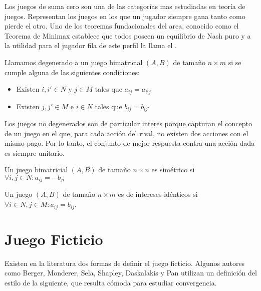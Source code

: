 Los juegos de suma cero son una de las categorías mas estudiadas en teoría de juegos. Representan los juegos en los que un jugador siempre gana tanto como pierde el otro. Uno de los teoremas fundacionales del area, conocido como el Teorema de Minimax \cite{nash:minmax} establece que todos poseen un equilibrio de Nash puro y a la utilidad para el jugador fila de este perfil la llama el .

\begin{definition}
    Llamamos degenerado a un juego bimatricial $(A, B)$ de tamaño $n \times m$ si se cumple alguna de las siguientes condiciones:
    \begin{itemize}
        \item Existen $i, i' \in N$ y $j \in M$ tales que $a_{ij} = a_{i'j}$
        \item Existen $j, j' \in M$ e $i \in N$ tales que $b_{ij} = b_{ij'}$
    \end{itemize}
\end{definition}
Los juegos no degenerados son de particular interes porque capturan el concepto de un juego en el que, para cada acción del rival, no existen dos acciones con el mismo pago. Por lo tanto, el conjunto de mejor respuesta contra una acción dada es siempre unitario.

\begin{definition}
    Un juego bimatricial $(A, B)$ de tamaño $n \times n$ es simétrico si $\forall i, j \in N : a_{ij} = -b_{ji}$
\end{definition}

\begin{definition}
    Un juego $(A, B)$ de tamaño $n \times m$ es de intereses idénticos si $\forall i \in N, j \in M : a_{ij} = b_{ij}$.
\end{definition}

\section{Juego Ficticio} \label{sec:def:fp}

Existen en la literatura dos formas de definir el juego ficticio. Algunos autores como Berger, Monderer, Sela, Shapley, Daskalakis y Pan \cite{browns:original} \cite{no:cycling} \cite{2x2:without} \cite{identical:interests} \cite{counter:karlin:strong} utilizan un definición del estilo de la siguiente, que resulta cómoda para estudiar convergencia.

